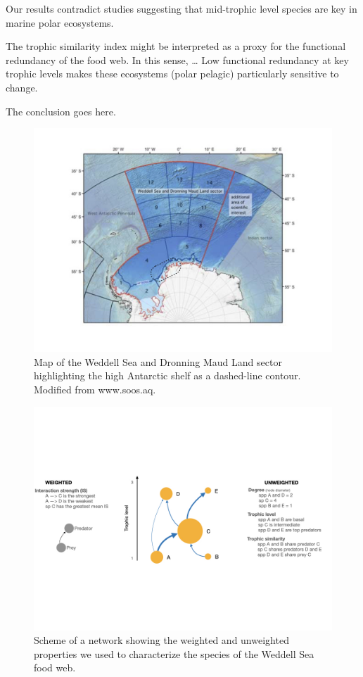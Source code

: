 \documentclass[gc, manuscript]{copernicus}
\begin{document}
Our results contradict studies suggesting that mid-trophic level species
are key in marine polar ecosystems.

The trophic similarity index might be interpreted as a proxy for the
functional redundancy of the food web. In this sense, \ldots{} Low
functional redundancy at key trophic levels makes these ecosystems
(polar pelagic) particularly sensitive to change. \citep{Murphy2016}

\clearpage
\conclusions[Conclusions]

The conclusion goes here.

\clearpage

\begin{figure}
\includegraphics[width=12cm]{Fig.1_StudyMap} \caption{Map of the Weddell Sea and Dronning Maud Land sector highlighting the high Antarctic shelf as a dashed-line contour. Modified from www.soos.aq.}\label{fig:unnamed-chunk-1}
\end{figure}

\clearpage

\begin{figure}
\includegraphics[width=12cm]{Fig.2_ToyFoodWeb} \caption{Scheme of a network showing the weighted and unweighted properties we used to characterize the species of the Weddell Sea food web.}\label{fig:unnamed-chunk-2}
\end{figure}
\end{document}
